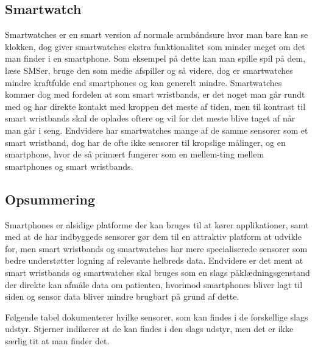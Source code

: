 \subsection{Smartwatch}
Smartwatches er en smart version af normale armbåndsure hvor man bare kan se klokken, dog giver smartwatches ekstra funktionalitet som minder meget om det man finder i en smartphone. 
Som eksempel på dette kan man spille spil på dem, læse SMSer, bruge den som medie afspiller og så videre, dog er smartwatches mindre kraftfulde end smartphones og kan generelt mindre. 
Smartwatches kommer dog med fordelen at som smart wristbands, er det noget man går rundt med og har direkte kontakt med kroppen det meste af tiden, men til kontrast til smart wristbands skal de oplades oftere og vil for det meste blive taget af når man går i seng. 
Endvidere har smartwatches mange af de samme sensorer som et smart wristband, dog har de ofte ikke sensorer til kropslige målinger, og en smartphone, hvor de så primært fungerer som en mellem-ting mellem smartphones og smart wristbands.

\subsection{Opsummering}
Smartphones er alsidige platforme der kan bruges til at kører applikationer, samt med at de har indbyggede sensorer gør dem til en attraktiv platform at udvikle for, men smart wristbands og smartwatches har mere specialiserede sensorer som bedre understøtter logning af relevante helbreds data.
Endvidere er det ment at smart wristbands og smartwatches skal bruges som en slags påklædningsgenstand der direkte kan afmåle data om patienten, hvorimod smartphones bliver lagt til siden og sensor data bliver mindre brugbart på grund af dette.


Følgende tabel dokumenterer hvilke sensorer, som kan findes i de forskellige slags udstyr. Stjerner indikerer at de kan findes i den slags udstyr, men det er ikke særlig tit at man finder det. %

